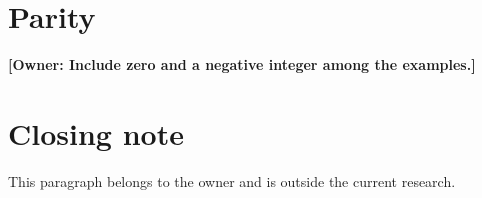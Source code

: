 \documentclass{article}
\theoremstyle{definition}
\newcommand{\taylor}[1]{\textbf{[Owner: #1]}}
\begin{document}
\section{Parity}
\taylor{Include zero and a negative integer among the examples.}

\section{Closing note}
This paragraph belongs to the owner and is outside the current research.
\end{document}
